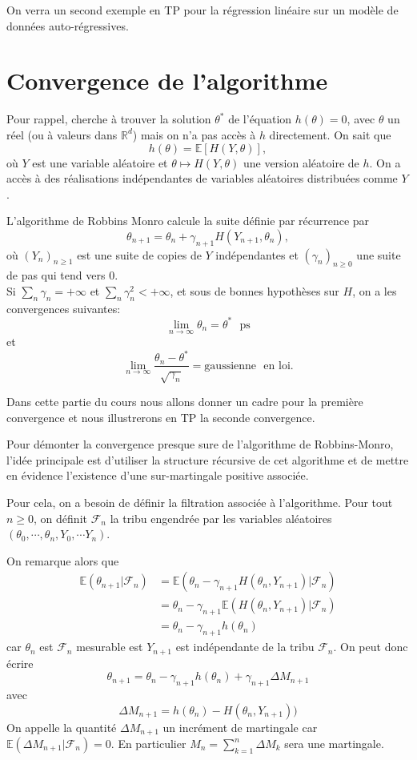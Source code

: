 \documentclass[a4paper,12pt]{book}
\newcommand{\E}{\mathbb{E}}
\begin{document}
On verra un second exemple en TP pour la régression linéaire sur un modèle de données auto-régressives.


\section{Convergence de l'algorithme}
Pour rappel, cherche à trouver la solution $\theta^*$ de l'équation $h(\theta)=0$, avec $\theta$ un réel (ou à valeurs dans $\mathbb{R}^d$) mais on n'a pas accès à $h$ directement. On sait que
$$h(\theta)=\mathbb{E}[H(Y,\theta)],$$
où $Y$ est une variable aléatoire et $\theta\mapsto H(Y,\theta)$ une version aléatoire de $h$. On a accès à des réalisations indépendantes de variables aléatoires distribuées comme $Y$.

L'algorithme de Robbins Monro calcule la suite définie par récurrence par
$$\theta_{n+1}=\theta_n+\gamma_{n+1} H(Y_{n+1},\theta_n),$$
où $(Y_n)_{n\geq 1}$ est une suite de copies de $Y$ indépendantes et $(\gamma_n)_{n\geq 0}$ une suite de pas  qui tend vers $0$.
\\

Si $\sum_n\gamma_n=+\infty$ et $\sum_n\gamma_n^2<+\infty$, et sous de bonnes hypothèses sur $H$, on a les convergences suivantes:
$$\lim_{n\to \infty}\theta_n= \theta^* \ \ \ \text{ps}$$
et
$$\lim_{n\to \infty}\frac{\theta_n-\theta^*}{\sqrt{\gamma_n}}= \text{gaussienne} \ \ \ \text{en loi.}$$

Dans cette partie du cours nous allons donner un cadre pour la première convergence et nous illustrerons en TP la seconde convergence.


Pour démonter la convergence presque sure de l'algorithme de Robbins-Monro, l'idée principale est d'utiliser la structure récursive de cet algorithme et de mettre en évidence l'existence d'une sur-martingale positive associée.

Pour cela, on a besoin de définir la filtration associée à l'algorithme. Pour tout $n\ge0$, on définit $\mathcal{F}_{n}$ la tribu engendrée par les variables aléatoires $(\theta_0, \cdots, \theta_n, Y_0, \cdots Y_{n})$.

On remarque alors que
\begin{align*}
\E(\theta_{n+1}\lvert \mathcal{F}_n)&=\E( \theta_n-\gamma_{n+1} H(\theta_n, Y_{n+1} )\lvert\mathcal{F}_n)\\
&= \theta_n -\gamma_{n+1}\E(H(\theta_n, Y_{n+1}) \lvert\mathcal{F}_n)\\
&= \theta_n-\gamma_{n+1} h(\theta_n)
\end{align*}
car $\theta_n$ est $\mathcal{F}_n$ mesurable est $Y_{n+1}$ est indépendante de la tribu $\mathcal{F}_n$.
On peut donc écrire
$$\theta_{n+1}=\theta_n-\gamma_{n+1} h(\theta_n) +\gamma_{n+1}\Delta M_{n+1}$$ avec
$$\Delta M_{n+1}= h(\theta_n)-H(\theta_n, Y_{n+1}) )$$
On appelle la quantité $\Delta M_{n+1}$ un incrément de martingale car $\E(\Delta M_{n+1}\lvert\mathcal{F}_n)=0$. En particulier $M_{n}=\sum_{k=1}^{n} \Delta M_{k}$ sera une martingale.
\end{document}
